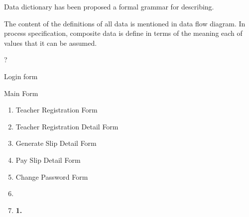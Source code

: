 \documentclass{article} %
\begin{document}
\noindent Data dictionary has been proposed a formal grammar for describing. 

\noindent The content of the definitions of all data is mentioned in data flow diagram. In process specification, composite data is define in terms of the meaning each of values that it can be assumed.

\noindent 

\noindent 

\noindent 

\noindent 

\noindent 

\noindent 

\noindent 

\noindent 

\noindent 

\noindent 

\noindent 

\noindent 

\noindent 

\noindent 

\noindent 

\noindent 

\noindent 

\noindent \textbf{                                                     }\underbar{}

\noindent \textbf{         }                                      \textbf{}?\textbf{}

\noindent 

\noindent            Login form

\noindent             Main Form \textbf{         }

\begin{enumerate}
\item \textbf{ }Teacher Registration Form 

\item  Teacher Registration Detail Form 

\item  Generate Slip Detail Form 

\item  Pay Slip Detail Form 

\item  Change Password Form 

\item  

\item  \textbf{1.  }
\end{enumerate}
\end{document}

